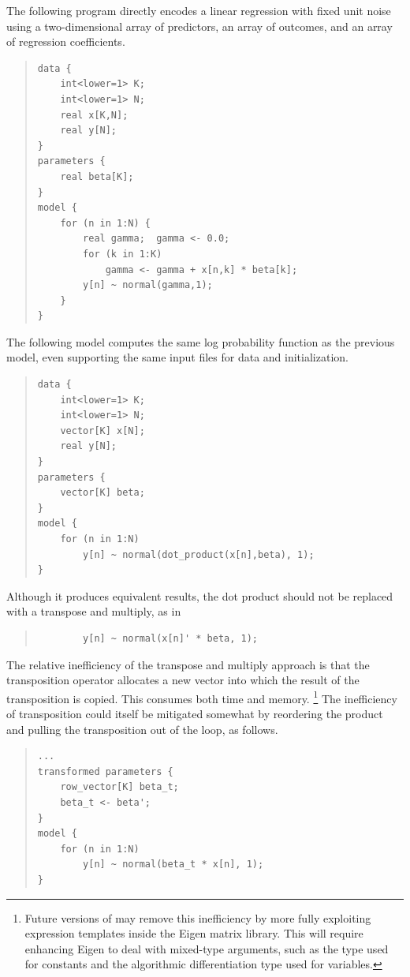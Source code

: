 The following program directly encodes a linear regression with fixed
unit noise using a two-dimensional array  of predictors, an
array  of outcomes, and an array  of regression
coefficients.
%
\begin{quote}
\begin{Verbatim}
data {
    int<lower=1> K;
    int<lower=1> N;
    real x[K,N];
    real y[N];
}
parameters {
    real beta[K];
}
model {
    for (n in 1:N) {
        real gamma;  gamma <- 0.0;
        for (k in 1:K)
            gamma <- gamma + x[n,k] * beta[k];
        y[n] ~ normal(gamma,1);
    }
}
\end{Verbatim}
\end{quote}
%
The following model computes the same log probability function as the
previous model, even supporting the same input files for data and
initialization.
%
\begin{quote}
\begin{Verbatim} 
data {
    int<lower=1> K;
    int<lower=1> N;
    vector[K] x[N];
    real y[N];
}
parameters {
    vector[K] beta;
}
model {
    for (n in 1:N)
        y[n] ~ normal(dot_product(x[n],beta), 1);
}
\end{Verbatim}
\end{quote}
%
Although it produces equivalent results, the dot product should not be
replaced with a transpose and multiply, as in
%
\begin{quote}
\begin{Verbatim} 
        y[n] ~ normal(x[n]' * beta, 1);
\end{Verbatim}
\end{quote}
%
The relative inefficiency of the transpose and multiply approach is
that the transposition operator allocates a new vector into which the
result of the transposition is copied.  This consumes both time
and memory.
%
\footnote{Future versions of \Stan may remove this inefficiency
by more fully exploiting expression templates inside the Eigen
\Cpp matrix library.  This will require enhancing Eigen to deal
with mixed-type arguments, such as the type  used
for constants and the algorithmic differentiation type
used for variables.}
%
The inefficiency of transposition could itself be mitigated somewhat by
reordering the product and pulling the transposition out of the loop,
as follows.
%
\begin{quote}
\begin{Verbatim} 
...
transformed parameters {
    row_vector[K] beta_t;
    beta_t <- beta';
}
model {
    for (n in 1:N)
        y[n] ~ normal(beta_t * x[n], 1);
}
\end{Verbatim}
\end{quote}
